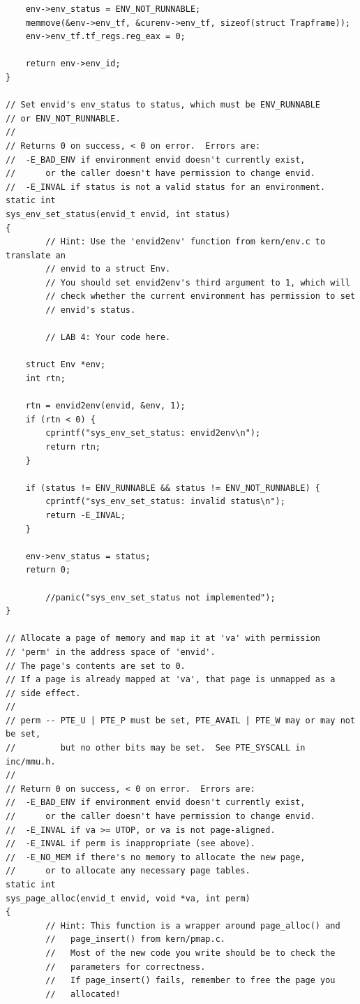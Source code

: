 \begin{ExerciseList}
\begin{verbatim}
    env->env_status = ENV_NOT_RUNNABLE;
    memmove(&env->env_tf, &curenv->env_tf, sizeof(struct Trapframe));
    env->env_tf.tf_regs.reg_eax = 0;

    return env->env_id;
}

// Set envid's env_status to status, which must be ENV_RUNNABLE
// or ENV_NOT_RUNNABLE.
//
// Returns 0 on success, < 0 on error.  Errors are:
//	-E_BAD_ENV if environment envid doesn't currently exist,
//		or the caller doesn't have permission to change envid.
//	-E_INVAL if status is not a valid status for an environment.
static int
sys_env_set_status(envid_t envid, int status)
{
        // Hint: Use the 'envid2env' function from kern/env.c to translate an
        // envid to a struct Env.
        // You should set envid2env's third argument to 1, which will
        // check whether the current environment has permission to set
        // envid's status.

        // LAB 4: Your code here.

    struct Env *env;
    int rtn;

    rtn = envid2env(envid, &env, 1);
    if (rtn < 0) {
        cprintf("sys_env_set_status: envid2env\n");
        return rtn;
    }

    if (status != ENV_RUNNABLE && status != ENV_NOT_RUNNABLE) {
        cprintf("sys_env_set_status: invalid status\n");
        return -E_INVAL;
    }

    env->env_status = status;
    return 0;

        //panic("sys_env_set_status not implemented");
}

// Allocate a page of memory and map it at 'va' with permission
// 'perm' in the address space of 'envid'.
// The page's contents are set to 0.
// If a page is already mapped at 'va', that page is unmapped as a
// side effect.
//
// perm -- PTE_U | PTE_P must be set, PTE_AVAIL | PTE_W may or may not be set,
//         but no other bits may be set.  See PTE_SYSCALL in inc/mmu.h.
//
// Return 0 on success, < 0 on error.  Errors are:
//	-E_BAD_ENV if environment envid doesn't currently exist,
//		or the caller doesn't have permission to change envid.
//	-E_INVAL if va >= UTOP, or va is not page-aligned.
//	-E_INVAL if perm is inappropriate (see above).
//	-E_NO_MEM if there's no memory to allocate the new page,
//		or to allocate any necessary page tables.
static int
sys_page_alloc(envid_t envid, void *va, int perm)
{
        // Hint: This function is a wrapper around page_alloc() and
        //   page_insert() from kern/pmap.c.
        //   Most of the new code you write should be to check the
        //   parameters for correctness.
        //   If page_insert() fails, remember to free the page you
        //   allocated!


\end{verbatim}
\end{ExerciseList}
